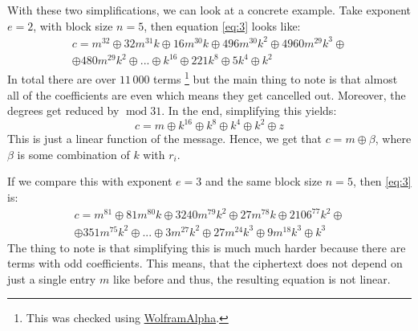 \documentclass{Resources/UoBLab1}
\theoremstyle{definition}
\begin{document}
With these two simplifications, we can look at a concrete example. Take exponent $e = 2$, with block size $n = 5$, then equation \eqref{eq:3} looks like:
\begin{equation*}
    \begin{split}
        c = m^{32} \oplus 32m^{31}k \oplus 16m^{30}k \oplus 496m^{30}k^{2} \oplus 4960m^{29}k^3 \oplus \\
        \oplus 480m^{29}k^2 \oplus ... \oplus  k^{16} \oplus 221k^8 \oplus 5k^4 \oplus k^2
    \end{split}
\end{equation*}
In total there are over $11\,000$ terms \footnote{This was checked using \href{https://www.wolframalpha.com/input?i=expand+\%28\%28\%28\%28\%28a\%2Bb\%29\%5E2\%2Bb\%2Bc\%29\%5E2\%2Bb\%2Bd\%29\%5E2\%2Bb\%2Be\%29\%5E2\%2Bb\%2Bf\%29\%5E2}{WolframAlpha}.} but the main thing to note is that almost all of the coefficients are even which means they get cancelled out. Moreover, the degrees get reduced by $\operatorname{mod} 31$. In the end, simplifying this yields:
\[
    c = m \oplus k^{16} \oplus k^8 \oplus k^4 \oplus k^2 \oplus z
\]
This is just a linear function of the message. Hence, we get that $c = m \oplus \beta$, where $\beta$ is some combination of $k$ with $r_i$.

If we compare this with exponent $e = 3$ and the same block size $n = 5$, then \eqref{eq:3} is:
\begin{equation*}
    \begin{split}
    c = m^{81} \oplus 81m^{80}k \oplus 3240m^{79}k^2 \oplus 27m^{78}k \oplus 2106^{77}k^2 \oplus \\ \oplus 351m^{75}k^2 \oplus ... \oplus 3m^{27}k^{2} \oplus 27m^{24}k^3 \oplus 9m^{18}k^3 \oplus k^3
    \end{split}
\end{equation*}
The thing to note is that simplifying this is much much harder because there are terms with odd coefficients. This means, that the ciphertext does not depend on just a single entry $m$ like before and thus, the resulting equation is not linear.
\end{document}
